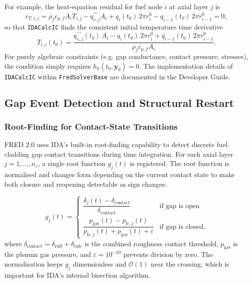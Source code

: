 \begin{refsection}
For example, the heat-equation residual for fuel node $i$ at axial layer $j$ is
\begin{equation}
  r_{T,i,j} =
    \rho_f c_{p,f} A_i \dot{T}_{i,j}
    - q_{v,j}^{\prime\prime\prime} A_i
    + q_{i}(t_0)\,2\pi r_i^0
    - q_{i-1}(t_0)\,2\pi r_{i-1}^0 = 0,
\end{equation}
so that \texttt{IDACalcIC} finds the consistent initial temperature time derivative
\begin{equation}
  \dot{T}_{i,j}(t_0)
  = \frac{q_{v,j}^{\prime\prime\prime}(t_0)\,A_i
          - q_{i}(t_0)\,2\pi r_i^0
          + q_{i-1}(t_0)\,2\pi r_{i-1}^0}
         {\rho_f c_{p,f} A_i}.
\end{equation}
For purely algebraic constraints (e.g. gap conductance, contact pressure, stresses), the condition simply requires $h_k(t_0, \mathbf{y}_0) = 0$.  The implementation details of \texttt{IDACalcIC} within \texttt{FredSolverBase} are documented in the Developer Guide.

\subsection{Gap Event Detection and Structural Restart}
\label{sec:gap_events}

\subsubsection{Root-Finding for Contact-State Transitions}

FRED 2.0 uses IDA's built-in root-finding capability to detect discrete fuel--cladding gap contact transitions during time integration. For each axial layer $j = 1, \ldots, n_z$, a single root function $g_j(t)$ is registered. The root function is normalised and changes form depending on the current contact state to make both closure and reopening detectable as sign changes:

\begin{equation}
  g_j(t) = \begin{cases}
    \dfrac{\delta_j(t) - \delta_\mathrm{contact}}{\delta_\mathrm{contact}}
      & \text{if gap is open} \\[10pt]
    \dfrac{p_\mathrm{gas}(t) - p_{\mathrm{fc},j}(t)}{p_{\mathrm{fc},j}(t) + p_\mathrm{gas}(t) + \varepsilon}
      & \text{if gap is closed,}
  \end{cases}
  \label{eq:root_function}
\end{equation}
where $\delta_\mathrm{contact} = \delta_\mathrm{ruff} + \delta_\mathrm{rufc}$ is the combined roughness contact threshold, $p_\mathrm{gas}$ is the plenum gas pressure, and $\varepsilon = 10^{-10}$ prevents division by zero. The normalisation keeps $g_j$ dimensionless and $\mathcal{O}(1)$ near the crossing, which is important for IDA's internal bisection algorithm.


\end{refsection}
